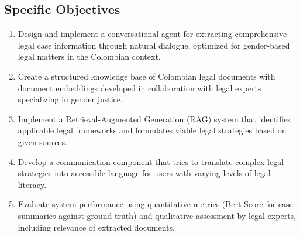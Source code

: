 \subsection{Specific Objectives}
\begin{enumerate}
    \item Design and implement a conversational agent for extracting comprehensive legal case information through natural dialogue, optimized for gender-based legal matters in the Colombian context.
    
    \item Create a structured knowledge base of Colombian legal documents with document embeddings developed in collaboration with legal experts specializing in gender justice.
    
    \item Implement a Retrieval-Augmented Generation (RAG) system that identifies applicable legal frameworks and formulates viable legal strategies based on given sources.
    
    \item Develop a communication component that tries to translate complex legal strategies into accessible language for users with varying levels of legal literacy.
    
    \item Evaluate system performance using quantitative metrics (Bert-Score for case summaries against ground truth) and qualitative assessment by legal experts, including relevance of extracted documents.
\end{enumerate}


